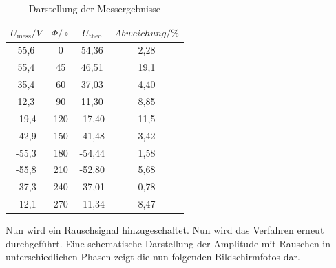 \begin{table}[H]
\centering
\caption{Darstellung der Messergebnisse}
\label{tab:1}
 \begin{tabular}{c c c c}
  \toprule
     $U_\text{mess} / V$ & $\Phi/\circ$ & $U_\text{theo}$ & $Abweichung / \%$ \\
  \midrule
  55,6  & 0    & 54,36 & 2,28\\
  55,4  & 45   & 46,51 & 19,1\\
  35,4  & 60   & 37,03 & 4,40\\
  12,3  & 90   & 11,30 & 8,85\\
  -19,4 & 120  &-17,40 & 11,5\\
  -42,9 & 150  &-41,48 & 3,42\\
  -55,3 & 180  &-54,44 & 1,58\\
  -55,8 & 210  &-52,80 & 5,68\\
  -37,3 & 240  &-37,01 & 0,78\\
  -12,1 & 270  &-11,34 & 8,47\\
  \bottomrule
\end{tabular}
\end{table}

Nun wird ein Rauschsignal hinzugeschaltet. Nun wird das Verfahren erneut durchgeführt.
Eine schematische Darstellung der Amplitude mit Rauschen in unterschiedlichen Phasen zeigt die nun folgenden
Bildschirmfotos dar.

